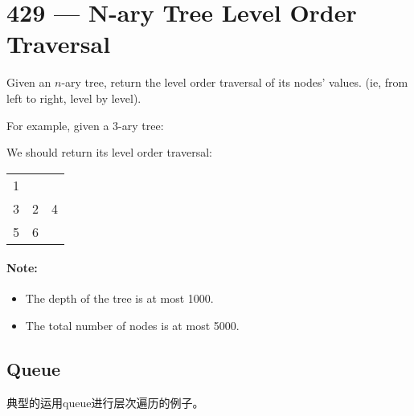 \section{429 --- N-ary Tree Level Order Traversal}
Given an $n$-ary tree, return the level order traversal of its nodes' values. (ie, from left to right, level by level).

For example, given a 3-ary tree:

\begin{figure}[H]
\end{figure}

We should return its level order traversal:
\begin{table}[H]
\begin{tabular}{lll}
1 & & \\
3 & 2 & 4\\
5 & 6 & 
\end{tabular}
\end{table}

\paragraph{Note:}

\begin{itemize}
\item The depth of the tree is at most 1000.
\item The total number of nodes is at most 5000.
\end{itemize}

\subsection{Queue}
典型的运用queue进行层次遍历的例子。

